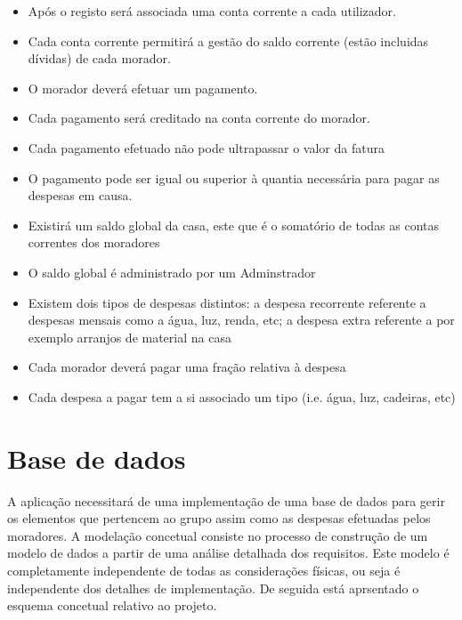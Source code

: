 \begin{itemize}
	
\item{Após o registo será associada uma conta corrente a cada utilizador.}

\item{Cada conta corrente permitirá a gestão do saldo corrente (estão incluidas dívidas) de cada morador.}

\item{O morador deverá efetuar um pagamento.}
 
\item{Cada pagamento será creditado na conta corrente do morador.}

\item{Cada pagamento efetuado não pode ultrapassar o valor da fatura}
 
 \item{O pagamento pode ser igual ou superior à quantia necessária para pagar as despesas em causa.}
 
 
\item{Existirá um saldo global da casa, este que é o somatório de todas as contas correntes dos moradores}
 
 \item{O saldo global é administrado por um Adminstrador}
 
\item{Existem dois tipos de despesas distintos: a despesa recorrente referente a despesas mensais como a água, luz, renda, etc; a despesa extra referente a por exemplo arranjos de material na casa}
 
\item{Cada morador deverá pagar uma fração relativa à despesa}
 
\item{Cada despesa a pagar tem a si associado um tipo (i.e. água, luz, cadeiras, etc)}

\end{itemize}


\section{Base de dados }
A aplicação necessitará de uma implementação de uma base de dados para gerir os elementos que pertencem ao grupo assim como as despesas efetuadas pelos moradores. A modelação concetual consiste no processo de construção de um modelo de dados a partir de uma análise detalhada dos requisitos.  Este modelo é completamente independente de todas as considerações físicas, ou seja é independente dos detalhes de implementação. De seguida está aprsentado o esquema concetual relativo ao projeto.  


